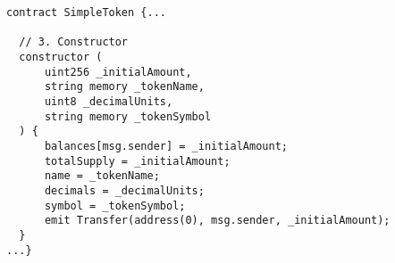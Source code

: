 \begin{lstlisting}[language=Solidity]
contract SimpleToken {...

  // 3. Constructor
  constructor (
      uint256 _initialAmount,
      string memory _tokenName,
      uint8 _decimalUnits,
      string memory _tokenSymbol
  ) {
      balances[msg.sender] = _initialAmount;
      totalSupply = _initialAmount;
      name = _tokenName;
      decimals = _decimalUnits;
      symbol = _tokenSymbol;
      emit Transfer(address(0), msg.sender, _initialAmount);
  }   
...}
\end{lstlisting}